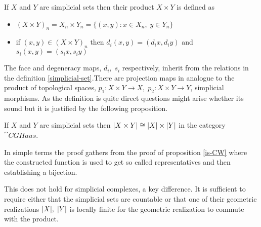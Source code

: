 \documentclass[../../main.tex]{subfiles}
\begin{document}
    \begin{definition}
        If $X$ and $Y$ are simplicial sets then their product $X\times Y$ is defined as 
        \begin{itemize}
            \item $(X\times Y)_n= X_n\times Y_n= \{(x,y):x\in X_n,\; y \in Y_n \}$
            \item if $(x,y)\in (X\times Y)_n$ then $d_i(x,y)=(d_ix,d_iy)$ and $s_i(x,y)=(s_ix,s_iy)$
        \end{itemize}
    \end{definition}
    
    The face and degeneracy maps, $d_i,\; s_i$ respectively, inherit from the relations in the definition \ref{simplicial-set}.There are projection maps in analogue to the product of topological spaces, $p_1:X\times Y \to X,\; p_2:X\times Y \to Y$, simplicial morphisms. As the definition is quite direct questions might arise whether its sound but it is justified by the following proposition.

    \begin{proposition}
        If $X$ and $Y$ are simplicial sets then $\geom[X\times Y]\cong \geom[X]\times \geom[Y]$ in the category $\cat{CGHaus}$.
    \end{proposition}

    In simple terms the proof gathers from the proof of proposition \ref{is-CW} where the constructed function is used to get so called representatives and then establishing a bijection. 

    This does not hold for simplicial complexes, a key difference. It is sufficient to require either that the simplicial sets are countable or that one of their geometric realizations $\geom[X],\; \geom[Y]$ is locally finite for the geometric realization to commute with the product. 
\end{document}
